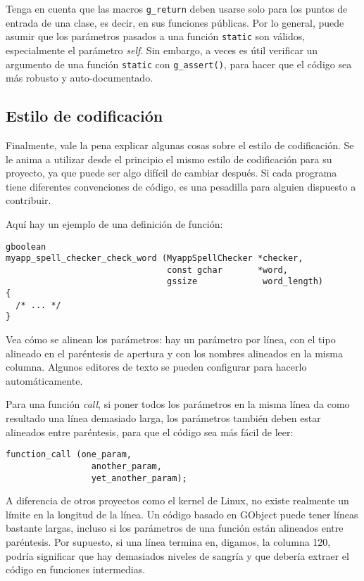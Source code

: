 Tenga en cuenta que las macros \lstinline{g_return} deben usarse solo para los puntos de entrada de una clase, es decir, en sus funciones públicas. Por lo general, puede asumir que los parámetros pasados a una función \lstinline{static} son válidos, especialmente el parámetro \emph{self}. Sin embargo, a veces es útil verificar un argumento de una función \lstinline{static} con \lstinline{g_assert()}, para hacer que el código sea más robusto y auto-documentado.

\subsection{Estilo de codificación}
Finalmente, vale la pena explicar algunas cosas sobre el estilo de codificación. Se le anima a utilizar desde el principio el mismo estilo de codificación para su proyecto, ya que puede ser algo difícil de cambiar después. Si cada programa tiene diferentes convenciones de código, es una pesadilla para alguien dispuesto a contribuir.

Aquí hay un ejemplo de una definición de función:

\begin{lstlisting}[style=GLib/GTK]
gboolean
myapp_spell_checker_check_word (MyappSpellChecker *checker,
                                const gchar       *word,
                                gssize             word_length)
{
  /* ... */
}
\end{lstlisting}

Vea cómo se alinean los parámetros: hay un parámetro por línea, con el tipo alineado en el paréntesis de apertura y con los nombres alineados en la misma columna. Algunos editores de texto se pueden configurar para hacerlo automáticamente.

Para una función \emph{call}, si poner todos los parámetros en la misma línea da como resultado una línea demasiado larga, los parámetros también deben estar alineados entre paréntesis, para que el código sea más fácil de leer:

\begin{lstlisting}[style=GLib/GTK]
  function_call (one_param,
                 another_param,
                 yet_another_param);
\end{lstlisting}

A diferencia de otros proyectos como el kernel de Linux, no existe realmente un límite en la longitud de la línea. Un código basado en GObject puede tener líneas bastante largas, incluso si los parámetros de una función están alineados entre paréntesis. Por supuesto, si una línea termina en, digamos, la columna 120, podría significar que hay demasiados niveles de sangría y que debería extraer el código en funciones intermedias.

